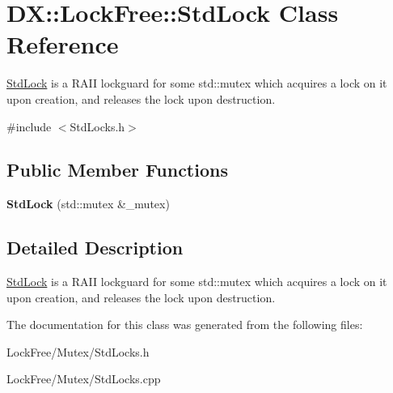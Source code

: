 \hypertarget{class_d_x_1_1_lock_free_1_1_std_lock}{\section{D\-X\-:\-:Lock\-Free\-:\-:Std\-Lock Class Reference}
\label{class_d_x_1_1_lock_free_1_1_std_lock}
}


\hyperlink{class_d_x_1_1_lock_free_1_1_std_lock}{Std\-Lock} is a R\-A\-I\-I lockguard for some std\-::mutex which acquires a lock on it upon creation, and releases the lock upon destruction.  




{\ttfamily \#include $<$Std\-Locks.\-h$>$}

\subsection*{Public Member Functions}
\begin{DoxyCompactItemize}
\item 
\hypertarget{class_d_x_1_1_lock_free_1_1_std_lock_a6911b8d1556df421f6698f768ab5880a}{{\bfseries Std\-Lock} (std\-::mutex \&\-\_\-mutex)}\label{class_d_x_1_1_lock_free_1_1_std_lock_a6911b8d1556df421f6698f768ab5880a}

\end{DoxyCompactItemize}


\subsection{Detailed Description}
\hyperlink{class_d_x_1_1_lock_free_1_1_std_lock}{Std\-Lock} is a R\-A\-I\-I lockguard for some std\-::mutex which acquires a lock on it upon creation, and releases the lock upon destruction. 

The documentation for this class was generated from the following files\-:\begin{DoxyCompactItemize}
\item 
Lock\-Free/\-Mutex/Std\-Locks.\-h\item 
Lock\-Free/\-Mutex/Std\-Locks.\-cpp\end{DoxyCompactItemize}
